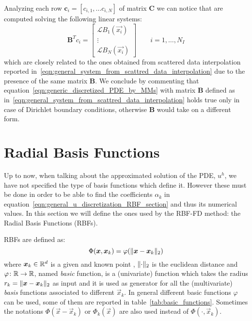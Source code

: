 Analyzing each row $\boldsymbol{c}_i = [c_{i,1}, \dots c_{i,N}]$ of matrix $\boldsymbol{C}$ we can notice that are computed solving the following linear systems:
\begin{equation}
	\boldsymbol{B}^T c_i = 
	\begin{bmatrix}
		\mathcal{L} B_1(\vec{x_i})  \\
		\vdots											  \\
		\mathcal{L} B_N(\vec{x_i})
	\end{bmatrix}
	\qquad i=1, \dots, N_I
\end{equation}
which are closely related to the ones obtained from scattered data interpolation reported in~\eqref{eqn:general_system_from_scattred_data_interpolation} due to the presence of the same matrix $\boldsymbol{B}$. We conclude by commenting that equation~\eqref{eqn:generic_discretized_PDE_by_MMs} with matrix $\boldsymbol{B}$ defined as in~\eqref{eqn:general_system_from_scattred_data_interpolation} holds true only in case of Dirichlet boundary conditions, otherwise $\boldsymbol{B}$ would take on a different form.



\section{Radial Basis Functions} \label{subsec:radial_basis_functions}
Up to now, when talking about the approximated solution of the PDE, $u^h$, we have not specified the type of basis functions which define it. However these must be done in order to be able to find the coefficients $\alpha_k$ in equation~\eqref{eqn:general_u_discretization_RBF_section} and thus its numerical values. In this section we will define the ones used by the RBF-FD method: the Radial Basis Functions (RBFs).

RBFs are defined as:
\begin{equation}
	\label{eq:RBF_definition}
	\Phi(\boldsymbol{x}, \boldsymbol{x}_k) = \varphi(\lVert\boldsymbol{x} - \boldsymbol{x}_k\rVert_2)
\end{equation}
where $\boldsymbol{x}_k \in \mathbb{R}^d$ is a given and known point , $\lVert\cdot\rVert_2$ is the euclidean distance and $\varphi\colon \mathbb{R} \to \mathbb{R}$, named \emph{basic} function, is a (univariate) function which takes the radius $r_k = \lVert\boldsymbol{x} - \boldsymbol{x}_k\rVert_2$ as input and it is used as generator for all the (multivariate) \emph{basis} functions associated to different $\vec{x}_k$. In general different basic functions $\varphi$ can be used, some of them are reported in table~\ref{tab:basic_functions}. Sometimes the notations $\Phi(\vec{x} - \vec{x}_k)$ or $\Phi_k({\vec{x}})$ are also used instead of $\Phi(\cdot, \vec{x}_k)$.

